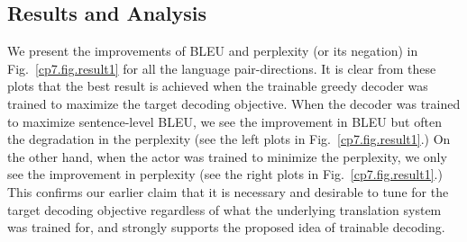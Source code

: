 \subsection{Results and Analysis}
We present the improvements of BLEU and perplexity (or its negation) in Fig.~\ref{cp7.fig.result1} for all the language pair-directions. It is clear from these plots that the best result is achieved when the trainable greedy decoder was trained to maximize the target decoding objective. When the decoder was trained to maximize sentence-level BLEU, we see the improvement in BLEU but often the degradation in the perplexity (see the left plots in Fig.~\ref{cp7.fig.result1}.) On the other hand, when the actor was trained to minimize the perplexity, we only see the improvement in perplexity (see the right plots in Fig.~\ref{cp7.fig.result1}.) This confirms our earlier claim that it is necessary and desirable to tune for the target decoding objective regardless of what the underlying translation system was trained for, and strongly supports the proposed idea of trainable decoding.

